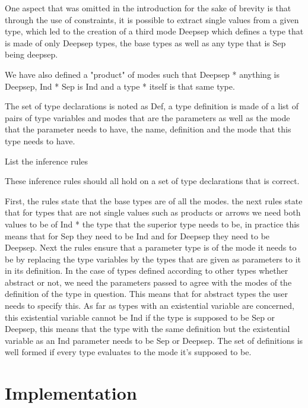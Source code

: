 \documentclass[a4]{article}
\begin{document}
One aspect that was omitted in the introduction for the sake of brevity is that through the use of constraints, it is possible to extract single values from a given type, which led to the creation of a third mode Deepsep which defines a type that is made of only Deepsep types, the base types as well as any type that is Sep being deepsep.

We have also defined a "product" of modes such that Deepsep * anything is Deepsep, Ind * Sep is Ind and a type * itself is that same type.

The set of type declarations is noted as Def, a type definition is made of a list of pairs of type variables and modes that are the parameters as well as the mode that the parameter needs to have, the name, definition and the mode that this type needs to have.

List the inference rules

These inference rules should all hold on a set of type declarations that is correct.

First, the rules state that the base types are of all the modes.
the next rules state that for types that are not single values such as products or arrows we need both values to be of Ind * the type that the superior type needs to be, in practice this means that for Sep they need to be Ind and for Deepsep they need to be Deepsep.
Next the rules ensure that a parameter type is of the mode it needs to be by replacing the type variables by the types that are given as parameters to it in its definition.
In the case of types defined according to other types whether abstract or not, we need the parameters passed to agree with the modes of the definition of the type in question. This means that for abstract types the user needs to specify this.
As far as types with an existential variable are concerned, this existential variable cannot be Ind if the type is supposed to be Sep or Deepsep, this means that the type with the same definition but the existential variable as an Ind parameter needs to be Sep or Deepsep.
The set of definitions is well formed if every type evaluates to the mode it's supposed to be.


\section{Implementation}
\end{document}
